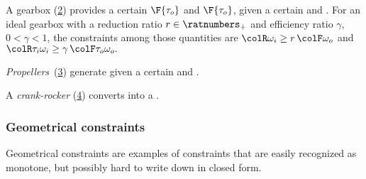 \begin{figure}[h]
	\centering
	\caption{}
	\label{fig:dc_motor}
\end{figure}

\begin{example}
	A gearbox (\cref{fig:gearbox}) provides a certain  $\F{\tau_o}$ and  $\F{\tau_o}$, given a certain
	 and .
	For an ideal gearbox with a reduction ratio $r \in \ratnumbers_+$ and efficiency ratio $\gamma$, $0<\gamma<1$, the constraints among those quantities are ${\colR \omega_i}\geq r\,{\colF \omega_o}$
	and ${\colR \tau_i\omega_i}\geq\gamma\,{\colF \tau_o\omega_o}.
	$
\end{example}
\begin{figure}[h]
	\centering
	\caption{}
	\label{fig:gearbox}
\end{figure}

\begin{example}
	\emph{Propellers}~(\cref{fig:propeller}) generate 
	given a certain  and .
\end{example}
\begin{figure}[h]
	\centering
	\caption{}
	\label{fig:propeller}
\end{figure}

\begin{example}
	A \emph{crank-rocker} (\cref{fig:crack}) converts  into a .
\end{example}
\begin{figure}[h]
	\centering
	\caption{}
	\label{fig:crack}
\end{figure}

\subsubsection{Geometrical constraints}

Geometrical constraints are examples of constraints that are easily recognized as monotone, but possibly hard to write down in closed form.

